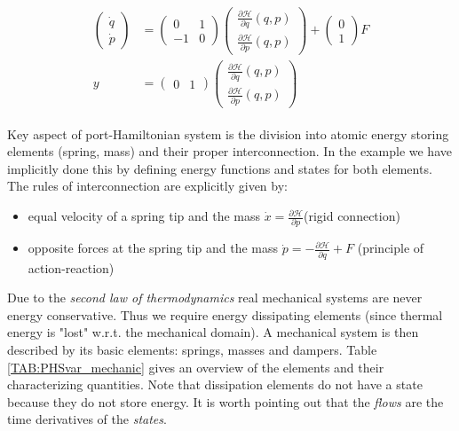 \documentclass[a4paper,twoside, openright,12pt]{report}
\begin{document}
{\begin{eqnarray}\label{EQ:HSexample}
\begin{aligned}
	\begin{pmatrix}\dot{q} \\ \dot{p}\end{pmatrix} &=
	\begin{pmatrix}0 & 1 \\ -1 & 0\end{pmatrix}
	\begin{pmatrix}\frac{\partial \mathcal{H}}{\partial q}(q,p) \\ \frac{\partial \mathcal{H}}{\partial p}(q,p)\end{pmatrix} + 
	\begin{pmatrix}0 \\ 1\end{pmatrix} F\\
	y &= \begin{pmatrix}	0 & 1\end{pmatrix}\begin{pmatrix}\frac{\partial \mathcal{H}}{\partial q}(q,p) \\ \frac{\partial \mathcal{H}}{\partial p}(q,p)\end{pmatrix}
	\end{aligned}
\end{eqnarray}
\newline
\vspace{10pt}%

Key aspect of port-Hamiltonian system is the division into atomic energy storing elements (spring, mass) and their proper interconnection. In the example we have implicitly done this by defining energy functions and states for both elements. The rules of interconnection are explicitly given by: 
\begin{itemize}
\itemsep0em
	\item equal velocity of a spring tip and the mass $\dot{x}=\frac{\partial \mathcal{H}}{\partial p}$(rigid connection)
	\item opposite forces at the spring tip and the mass $\dot{p}=-\frac{\partial \mathcal{H}}{\partial q}+F$ (principle of action-reaction) 
\end{itemize}

Due to the \emph{second law of thermodynamics} real mechanical systems are never energy conservative. Thus we require energy dissipating elements (since thermal energy is "lost" w.r.t. the mechanical domain). A mechanical system is then described by its basic elements: springs, masses and dampers. Table \ref{TAB:PHSvar_mechanic} gives an overview of the elements and their characterizing quantities. Note that dissipation elements do not have a state because they do not store energy. It is worth pointing out that the \emph{flows} are the time derivatives of the \emph{states}.    



}
\end{document}
